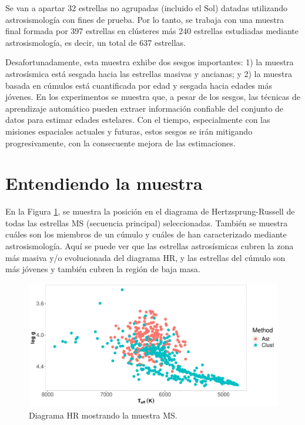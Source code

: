 Se van a apartar 32 estrellas no agrupadas (incluido el Sol) datadas utilizando astrosismología con fines de prueba. Por lo tanto, se trabaja con una muestra final formada por 397 estrellas en clústeres más 240 estrellas estudiadas mediante astrosismología, es decir, un total de 637 estrellas.

Desafortunadamente, esta muestra exhibe dos sesgos importantes: 1) la muestra astrosísmica está sesgada hacia las estrellas masivas y ancianas; y 2) la muestra basada en cúmulos está cuantificada por edad y sesgada hacia edades más jóvenes. En los experimentos se muestra que, a pesar de los sesgos, las técnicas de aprendizaje automático pueden extraer información confiable del conjunto de datos para estimar edades estelares. Con el tiempo, especialmente con las misiones espaciales actuales y futuras, estos sesgos se irán mitigando progresivamente, con la consecuente mejora de las estimaciones.


\section{Entendiendo la muestra}

En la Figura \ref{Fig:HR_select}, se muestra la posición en el diagrama de Hertzsprung-Russell de todas las estrellas MS (secuencia principal) seleccionadas. También se muestra cuáles son los miembros de un cúmulo y cuáles de han caracterizado mediante astrosismología. Aquí se puede ver que las estrellas astrosísmicas cubren la zona más masiva y/o evolucionada del diagrama HR, y las estrellas del cúmulo son más jóvenes y también cubren la región de baja masa.

\begin{figure}[H]
\begin{center}
\includegraphics[width=0.9\linewidth]{Figuras/sampling_MS_astro_clust_embedded.pdf}
\end{center}
\caption{Diagrama HR mostrando la muestra MS.}
 \label{Fig:HR_select}
\end{figure}

